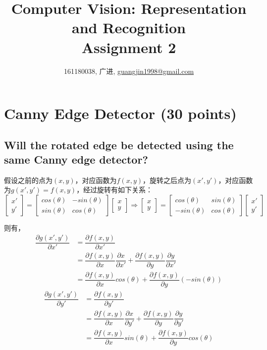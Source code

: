 \documentclass[a4paper,UTF8,11pt]{article}
\numberwithin{equation}{section}
\begin{document}
\title{Computer Vision: Representation and Recognition\\
Assignment 2}
\author{161180038, 广进, \href{mailto:guangjin1998@gmail.com}{guangjin1998@gmail.com}}
\maketitle

\section{Canny Edge Detector (30 points)}
\subsection{Will the rotated edge be detected using the same Canny edge detector?}
假设之前的点为$(x,y)$，对应函数为$ f(x,y) $，旋转之后点为$(x',y')$，对应函数为$ g(x',y') = f(x,y) $，经过旋转有如下关系：
\begin{equation}
{
\left[ \begin{array}{c}
x'\\
y'
\end{array}
\right ]}
=
{
\left[ \begin{array}{cc}
cos(\theta) & -sin(\theta)\\
sin(\theta) & cos(\theta)
\end{array} 
\right ]}
{
\left[ \begin{array}{c}
x\\
y
\end{array}
\right ]}
\Rightarrow
{
\left[ \begin{array}{c}
x\\
y
\end{array}
\right ]}
=
{
\left[ \begin{array}{cc}
cos(\theta) & sin(\theta)\\
-sin(\theta) & cos(\theta)
\end{array} 
\right ]}
{
\left[ \begin{array}{c}
x'\\
y'
\end{array}
\right ]}
\end{equation}

则有，
\begin{align*}
\dfrac{\partial g(x',y')}{\partial x'} &= \dfrac{\partial f(x,y)}{\partial x'} \\
&=\dfrac{\partial f(x,y)}{\partial x}\dfrac{\partial x}{\partial x'}+\dfrac{\partial f(x,y)}{\partial y}\dfrac{\partial y}{\partial x'}\\
&=\dfrac{\partial f(x,y)}{\partial x} cos(\theta)+\dfrac{\partial f(x,y)}{\partial y}(-sin(\theta))
\end{align*}
\begin{align*}
\dfrac{\partial g(x',y')}{\partial y'} &= \dfrac{\partial f(x,y)}{\partial y'} \\
&=\dfrac{\partial f(x,y)}{\partial x}\dfrac{\partial x}{\partial y'}+\dfrac{\partial f(x,y)}{\partial y}\dfrac{\partial y}{\partial y'}\\
&=\dfrac{\partial f(x,y)}{\partial x} sin(\theta)+\dfrac{\partial f(x,y)}{\partial y}cos(\theta)
\end{align*}
\end{document}
